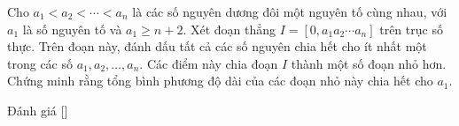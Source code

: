 \ifshowproblem
\begin{problem}\label{problem:GBR-2015-TST-N3-P3}
    Cho \( a_1 < a_2 < \cdots < a_n \) là các số nguyên dương đôi một nguyên tố cùng nhau,
    với \( a_1 \) là số nguyên tố và \( a_1 \ge n + 2 \).  
    Xét đoạn thẳng \( I = [0, a_1 a_2 \cdots a_n] \) trên trục số thực.  
    Trên đoạn này, đánh dấu tất cả các số nguyên chia hết cho ít nhất một trong các số \( a_1, a_2, \ldots, a_n \).  
    Các điểm này chia đoạn \( I \) thành một số đoạn nhỏ hơn.  
    Chứng minh rằng tổng bình phương độ dài của các đoạn nhỏ này chia hết cho \( a_1 \).
\end{problem}
\fi

\ifshowinfo
Đánh giá [\textbf{}]
\fi